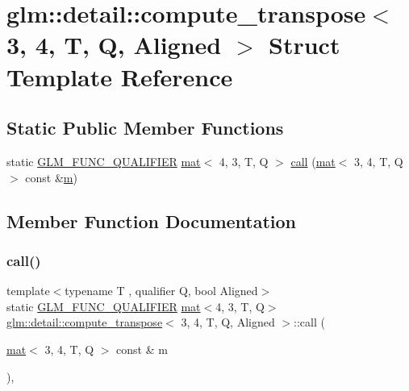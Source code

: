 \hypertarget{structglm_1_1detail_1_1compute__transpose_3_013_00_014_00_01_t_00_01_q_00_01_aligned_01_4}{}\section{glm\+:\+:detail\+:\+:compute\+\_\+transpose$<$ 3, 4, T, Q, Aligned $>$ Struct Template Reference}
\label{structglm_1_1detail_1_1compute__transpose_3_013_00_014_00_01_t_00_01_q_00_01_aligned_01_4}
\subsection*{Static Public Member Functions}
\begin{DoxyCompactItemize}
\item 
static \mbox{\hyperlink{setup_8hpp_a33fdea6f91c5f834105f7415e2a64407}{G\+L\+M\+\_\+\+F\+U\+N\+C\+\_\+\+Q\+U\+A\+L\+I\+F\+I\+ER}} \mbox{\hyperlink{structglm_1_1mat}{mat}}$<$ 4, 3, T, Q $>$ \mbox{\hyperlink{structglm_1_1detail_1_1compute__transpose_3_013_00_014_00_01_t_00_01_q_00_01_aligned_01_4_a64a4ddeead1663b8289e74e0fc262078}{call}} (\mbox{\hyperlink{structglm_1_1mat}{mat}}$<$ 3, 4, T, Q $>$ const \&\mbox{\hyperlink{_s_d_l__opengl__glext_8h_af593500c283bf1a787a6f947f503a5c2}{m}})
\end{DoxyCompactItemize}


\subsection{Member Function Documentation}
\mbox{\label{structglm_1_1detail_1_1compute__transpose_3_013_00_014_00_01_t_00_01_q_00_01_aligned_01_4_a64a4ddeead1663b8289e74e0fc262078}} 
\subsubsection{\texorpdfstring{call()}{call()}}
{\footnotesize\ttfamily template$<$typename T , qualifier Q, bool Aligned$>$ \\
static \mbox{\hyperlink{setup_8hpp_a33fdea6f91c5f834105f7415e2a64407}{G\+L\+M\+\_\+\+F\+U\+N\+C\+\_\+\+Q\+U\+A\+L\+I\+F\+I\+ER}} \mbox{\hyperlink{structglm_1_1mat}{mat}}$<$4, 3, T, Q$>$ \mbox{\hyperlink{structglm_1_1detail_1_1compute__transpose}{glm\+::detail\+::compute\+\_\+transpose}}$<$ 3, 4, T, Q, Aligned $>$\+::call (\begin{DoxyParamCaption}\item[{\mbox{\hyperlink{structglm_1_1mat}{mat}}$<$ 3, 4, T, Q $>$ const \&}]{m }\end{DoxyParamCaption})\hspace{0.3cm}{\ttfamily [inline]}, {\ttfamily [static]}}




